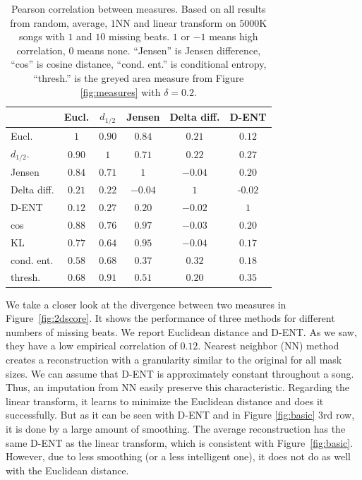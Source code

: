 \documentclass{article}
\begin{document}
\begin{table}[t]
\begin{small}
\begin{center}
\begin{tabular}{|l|c|c|c|c|c|} \hline
 & Eucl. & $d_{1/2}$ & Jensen & Delta diff. & D-ENT \\ \hline
Eucl. & $1$ & $0.90$ & $0.84$ & $0.21$ & $0.12$ \\ 
$d_{1/2}$. & $0.90$ & $1$ & $0.71$ & $0.22$ & $0.27$ \\ 
Jensen & $0.84$ & $0.71$ & $1$ & $-0.04$ & $0.20$ \\ \hline 
Delta diff. & $\mathbf{0.21}$ & $0.22$ & $-0.04$ & $1$ & -$0.02$ \\ 
D-ENT & $\mathbf{0.12}$ & $0.27$ & $0.20$ & $-0.02$ & $1$ \\ \hline
cos & $0.88$ & $0.76$ & $0.97$ & $-0.03$ & $0.20$ \\
KL & $0.77$ & $0.64$ & $0.95$ & $-0.04$ & $0.17$ \\ 
cond. ent. & $0.58$ & $0.68$ & $0.37$ & $0.32$ & $0.18$ \\
thresh. & $0.68$ & $0.91$ & $0.51$ & $0.20$ & $0.35$ \\ \hline
\end{tabular}
\caption{Pearson correlation between measures. Based on all results
  from random, average, $1$NN and linear transform on $5000$K songs
  with $1$ and $10$ missing beats. $1$ or $-1$ means high correlation,
  $0$ means none. ``Jensen'' is Jensen difference, ``cos'' is cosine
  distance, ``cond. ent.'' is conditional entropy, ``thresh.'' is the
  greyed area measure from Figure \ref{fig:measures} with $\delta =
  0.2$.
\label{tab:corrs}}
\end{center}
\end{small}
\end{table}

We take a closer look at the divergence between two measures in
Figure~\ref{fig:2dscore}.  It shows the performance of three methods
for different numbers of missing beats. We report Euclidean distance
and D-ENT. As we saw, they have a low empirical correlation of
$0.12$. Nearest neighbor (NN) method creates a reconstruction with a
granularity similar to the original for all mask sizes. We can assume
that D-ENT is approximately constant throughout a song. Thus, an
imputation from NN easily preserve this characteristic.  Regarding the
linear transform, it learns to minimize the Euclidean distance and
does it successfully. But as it can be seen with D-ENT and in Figure
\ref{fig:basic} $3$rd row, it is done by a large amount of
smoothing. The average reconstruction has the same D-ENT as the linear
transform, which is consistent with
Figure~\ref{fig:basic}.  However, due to less
smoothing (or a less intelligent one), it does not do as well with the
Euclidean distance.
\end{document}

